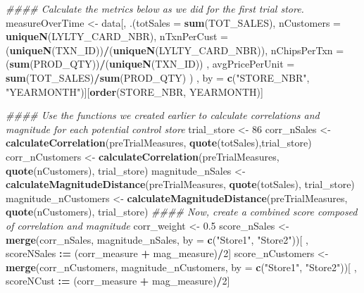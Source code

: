 \documentclass[
]{article}
\newenvironment{Shaded}{\begin{snugshade}}{\end{snugshade}}
\newcommand{\CommentTok}[1]{\textcolor[rgb]{0.56,0.35,0.01}{\textit{#1}}}
\newcommand{\DataTypeTok}[1]{\textcolor[rgb]{0.13,0.29,0.53}{#1}}
\newcommand{\DecValTok}[1]{\textcolor[rgb]{0.00,0.00,0.81}{#1}}
\newcommand{\ErrorTok}[1]{\textcolor[rgb]{0.64,0.00,0.00}{\textbf{#1}}}
\newcommand{\FloatTok}[1]{\textcolor[rgb]{0.00,0.00,0.81}{#1}}
\newcommand{\KeywordTok}[1]{\textcolor[rgb]{0.13,0.29,0.53}{\textbf{#1}}}
\newcommand{\NormalTok}[1]{#1}
\newcommand{\OperatorTok}[1]{\textcolor[rgb]{0.81,0.36,0.00}{\textbf{#1}}}
\newcommand{\StringTok}[1]{\textcolor[rgb]{0.31,0.60,0.02}{#1}}
\begin{document}
\begin{Shaded}
\begin{Highlighting}[]
\CommentTok{#### Calculate the metrics below as we did for the first trial store.}
\NormalTok{measureOverTime <-}\StringTok{ }\NormalTok{data[, .(}\DataTypeTok{totSales =} \KeywordTok{sum}\NormalTok{(TOT_SALES),}
                            \DataTypeTok{nCustomers =} \KeywordTok{uniqueN}\NormalTok{(LYLTY_CARD_NBR),}
                            \DataTypeTok{nTxnPerCust =}\NormalTok{ (}\KeywordTok{uniqueN}\NormalTok{(TXN_ID))}\OperatorTok{/}\NormalTok{(}\KeywordTok{uniqueN}\NormalTok{(LYLTY_CARD_NBR)),}
                            \DataTypeTok{nChipsPerTxn =}\NormalTok{ (}\KeywordTok{sum}\NormalTok{(PROD_QTY))}\OperatorTok{/}\NormalTok{(}\KeywordTok{uniqueN}\NormalTok{(TXN_ID)) , }
                            \DataTypeTok{avgPricePerUnit =} \KeywordTok{sum}\NormalTok{(TOT_SALES)}\OperatorTok{/}\KeywordTok{sum}\NormalTok{(PROD_QTY) ) , by =}\StringTok{ }\KeywordTok{c}\NormalTok{(}\StringTok{"STORE_NBR"}\NormalTok{, }\StringTok{"YEARMONTH"}\NormalTok{)][}\KeywordTok{order}\NormalTok{(STORE_NBR, YEARMONTH)]}

\CommentTok{#### Use the functions we created earlier to calculate correlations and magnitude for each potential control store}
\NormalTok{trial_store <-}\StringTok{ }\DecValTok{86}
\NormalTok{corr_nSales <-}\StringTok{ }\KeywordTok{calculateCorrelation}\NormalTok{(preTrialMeasures, }\KeywordTok{quote}\NormalTok{(totSales),trial_store)}
\NormalTok{corr_nCustomers <-}\StringTok{ }\KeywordTok{calculateCorrelation}\NormalTok{(preTrialMeasures, }\KeywordTok{quote}\NormalTok{(nCustomers), trial_store)}
\NormalTok{magnitude_nSales <-}\StringTok{ }\KeywordTok{calculateMagnitudeDistance}\NormalTok{(preTrialMeasures, }\KeywordTok{quote}\NormalTok{(totSales), trial_store)}
\NormalTok{magnitude_nCustomers <-}\StringTok{ }\KeywordTok{calculateMagnitudeDistance}\NormalTok{(preTrialMeasures, }\KeywordTok{quote}\NormalTok{(nCustomers), trial_store)}
\CommentTok{#### Now, create a combined score composed of correlation and magnitude}
\NormalTok{corr_weight <-}\StringTok{ }\FloatTok{0.5}
\NormalTok{score_nSales <-}\StringTok{ }\KeywordTok{merge}\NormalTok{(corr_nSales, magnitude_nSales, }\DataTypeTok{by =} \KeywordTok{c}\NormalTok{(}\StringTok{"Store1"}\NormalTok{, }\StringTok{"Store2"}\NormalTok{))[ , scoreNSales }\OperatorTok{:}\ErrorTok{=}\StringTok{ }\NormalTok{(corr_measure }\OperatorTok{+}\StringTok{ }\NormalTok{mag_measure)}\OperatorTok{/}\DecValTok{2}\NormalTok{]}
\NormalTok{score_nCustomers <-}\StringTok{ }\KeywordTok{merge}\NormalTok{(corr_nCustomers, magnitude_nCustomers, }\DataTypeTok{by =} \KeywordTok{c}\NormalTok{(}\StringTok{"Store1"}\NormalTok{, }\StringTok{"Store2"}\NormalTok{))[ , scoreNCust }\OperatorTok{:}\ErrorTok{=}\StringTok{ }\NormalTok{(corr_measure }\OperatorTok{+}\StringTok{ }\NormalTok{mag_measure)}\OperatorTok{/}\DecValTok{2}\NormalTok{]}


\end{Highlighting}
\end{Shaded}
\end{document}
